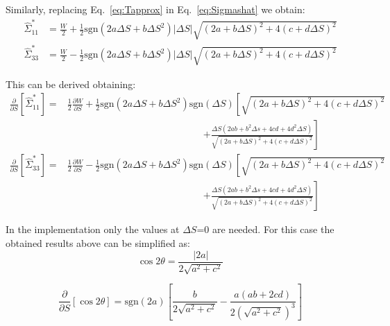 Similarly, replacing Eq.~\ref{eq:Tapprox} in Eq.~\ref{eq:Sigmashat} we obtain:
\begin{align}
\hat{\Sigma}^*_{11} &= \frac{W}{2} + \frac{1}{2} \mathrm{sgn}\left(2a\Delta S + b \Delta S^2\right)\left| \Delta S\right| \sqrt{\left(2a +b \Delta S \right)^2 +4\left( c +d \Delta S\right)^2}\\
\hat{\Sigma}^*_{33} &= \frac{W}{2} - \frac{1}{2} \mathrm{sgn}\left(2a\Delta S + b \Delta S^2\right)\left| \Delta S\right| \sqrt{\left(2a +b \Delta S \right)^2 +4\left( c +d \Delta S\right)^2}\label{eq:SigmasSing}
\end{align}

This can be derived obtaining:
\begin{align}
\frac{\partial }{\partial S} \left[\hat{\Sigma}^*_{11} \right] =& \frac{1}{2}\frac{\partial W }{\partial S}
+\frac{1}{2}\mathrm{sgn}\left(2a\Delta S +b \Delta S^2 \right)\mathrm{sgn}(\Delta S)\left[
\sqrt{\left(2a +b \Delta S \right)^2 +4\left( c +d \Delta S\right)^2}
\right. \nonumber \\ & \qquad  \qquad \qquad \qquad \qquad  \qquad \qquad\left. 
+\frac{\Delta S \left(2ab+b^2 \Delta s +4 c d+ 4 d^2 \Delta S \right)}{\sqrt{\left(2a +b \Delta S \right)^2 +4\left( c +d \Delta S\right)^2}}
\right] \\
\frac{\partial }{\partial S} \left[\hat{\Sigma}^*_{33} \right] =& \frac{1}{2}\frac{\partial W }{\partial S}
-\frac{1}{2}\mathrm{sgn}\left(2a\Delta S +b \Delta S^2 \right)\mathrm{sgn}(\Delta S)\left[
\sqrt{\left(2a +b \Delta S \right)^2 +4\left( c +d \Delta S\right)^2}
\right. \nonumber \\ & \qquad  \qquad \qquad \qquad \qquad  \qquad \qquad\left. 
+\frac{\Delta S \left(2ab+b^2 \Delta s +4 c d+ 4 d^2 \Delta S \right)}{\sqrt{\left(2a +b \Delta S \right)^2 +4\left( c +d \Delta S\right)^2}}
\right] 
\end{align}

In the implementation only the values at $\Delta S$=0 are needed. For this case the obtained results above can be simplified as:
\begin{equation}
\cos 2 \theta = \frac{\left| 2a\right|}{2\sqrt{a^2 + c^2}}
\end{equation}

\begin{equation}
\frac{\partial }{\partial S} \left[ \cos 2\theta \right] = \mathrm{sgn}(2a)\left[
\frac{b}{2\sqrt{a^2 + c^2 }}-\frac{a(ab+2cd)}{2\left(\sqrt{a^2 + c^2}\right)^3}
\right]
\end{equation}

